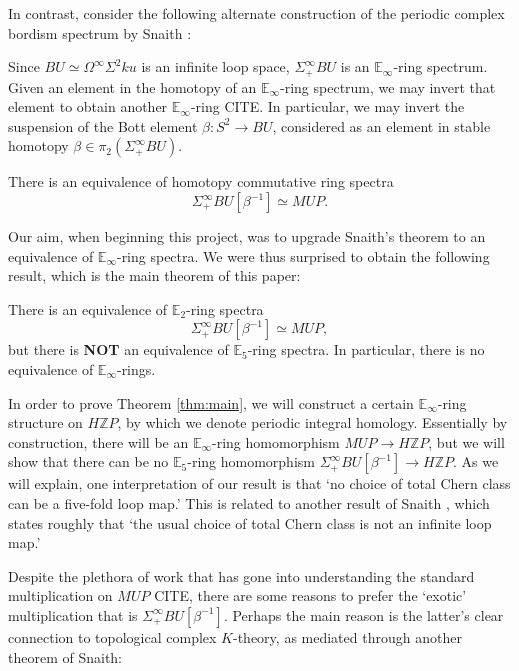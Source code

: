 In contrast, consider the following alternate construction of the periodic complex bordism spectrum by Snaith \cite{SnaithOriginal}:

Since $BU \simeq \Omega^{\infty} \Sigma^2 ku$ is an infinite loop space, $\Sigma^{\infty}_+ BU$ is an $\mathbb{E}_\infty$-ring spectrum.  Given an element in the homotopy of an $\mathbb{E}_\infty$-ring spectrum, we may invert that element to obtain another $\mathbb{E}_\infty$-ring CITE.  In particular, we may invert the suspension of the Bott element $\beta:S^2 \longrightarrow BU$, considered as an element in stable homotopy $\beta \in \pi_2(\Sigma^{\infty}_+ BU)$.

\begin{thm}
There is an equivalence of homotopy commutative ring spectra
$$\Sigma^{\infty}_+ BU[\beta^{-1}] \simeq MUP.$$
\end{thm}

Our aim, when beginning this project, was to upgrade Snaith's theorem to an equivalence of $\mathbb{E}_\infty$-ring spectra.  We were thus surprised to obtain the following result, which is the main theorem of this paper:

\begin{thm} \label{thm:main}
There is an equivalence of $\mathbb{E}_2$-ring spectra
$$\Sigma^{\infty}_+ BU[\beta^{-1}] \simeq MUP,$$
but there is \textbf{NOT} an equivalence of $\mathbb{E}_5$-ring spectra.  In particular, there is no equivalence of $\mathbb{E}_\infty$-rings.
\end{thm}

\begin{rmk}
In order to prove Theorem \ref{thm:main}, we will construct a certain $\mathbb{E}_\infty$-ring structure on $H\mathbb{Z}P$, by which we denote periodic integral homology.  Essentially by construction, there will be an $\mathbb{E}_\infty$-ring homomorphism $MUP \longrightarrow H\mathbb{Z}P$, but we will show that there can be no $\mathbb{E}_5$-ring homomorphism $\Sigma^{\infty}_+ BU[\beta^{-1}] \longrightarrow H\mathbb{Z}P$.  As we will explain, one interpretation of our result is that `no choice of total Chern class can be a five-fold loop map.'  This is related to another result of Snaith \cite{SnaithNotMultiplicative}, which states roughly that `the usual choice of total Chern class is not an infinite loop map.'
\end{rmk}

Despite the plethora of work that has gone into understanding the standard multiplication on $MUP$ CITE, there are some reasons to prefer the `exotic' multiplication that is $\Sigma^{\infty}_+ BU[\beta^{-1}]$.  Perhaps the main reason is the latter's clear connection to topological complex $K$-theory, as mediated through another theorem of Snaith:

